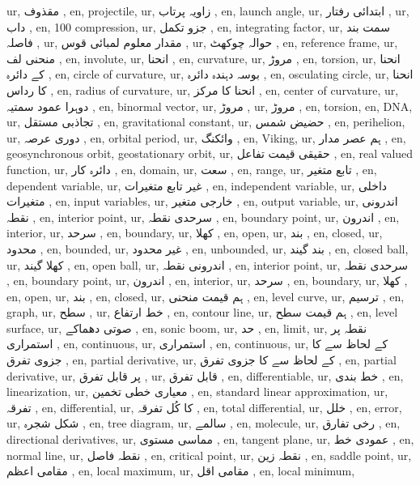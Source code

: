 ur, مقذوف  ,
en, projectile,
ur, زاویہ پرتاب ,
en, launch angle,
ur, ابتدائی رفتار ,
ur,  داب ,
en, 100 compression,
ur, جزو تکمل  ,
en, integrating factor,
ur, سمت بند فاصلہ ,
ur, مقدار معلوم لمبائی قوس ,
ur, حوالہ چوکھٹ ,
en, reference frame,
ur, منحنی لف ,
en, involute,
ur,  انحنا ,
en, curvature,
ur, مروڑ ,
en, torsion,
ur, انحنا کے دائرہ ,
en, circle of curvature,
ur, بوسہ دہندہ دائرہ ,
en, osculating circle,
ur,  انحنا کا رداس ,
en, radius of curvature,
ur,  انحنا کا مرکز ,
en, center of curvature,
ur, دوہرا عمود سمتیہ ,
en, binormal vector,
ur, مروڑ ,
ur, مروڑ ,
en, torsion,
en, DNA,
ur, تجاذبی مستقل ,
en, gravitational constant,
ur, حضیض شمس ,
en, perihelion,
ur, دوری عرصہ  ,
en, orbital period,
ur, وائکنگ  ,
en, Viking,
ur, ہم عصر مدار ,
en, geosynchronous orbit, geostationary orbit,
ur, حقیقی قیمت تفاعل ,
en, real valued function,
ur, دائرہ کار ,
en, domain,
ur, سعت ,
en, range,
ur, تابع متغیر ,
en, dependent variable,
ur, غیر تابع متغیرات ,
en, independent variable,
ur, داخلی متغیرات ,
en, input variables,
ur, خارجی متغیر ,
en, output variable,
ur, اندرونی نقطہ ,
en, interior point,
ur, سرحدی نقطہ ,
en, boundary point,
ur,  اندرون ,
en, interior,
ur, سرحد ,
en, boundary,
ur, کھلا ,
en, open,
ur, بند ,
en, closed,
ur, محدود ,
en, bounded,
ur, غیر محدود ,
en, unbounded,
ur, بند گیند ,
en, closed ball,
ur, کھلا گیند ,
en, open ball,
ur, اندرونی نقطہ ,
en, interior point,
ur, سرحدی نقطہ ,
en, boundary point,
ur, اندرون ,
en, interior,
ur, سرحد ,
en, boundary,
ur, کھلا ,
en, open,
ur,  بند ,
en, closed,
ur, ہم قیمت منحنی ,
en, level curve,
ur, ترسیم ,
en, graph,
ur, سطح ,
ur,  خط ارتفاع ,
en, contour line,
ur,  ہم قیمت سطح ,
en, level surface,
ur, صوتی دھماکے  ,
en, sonic boom,
ur, حد ,
en, limit,
ur, نقطہ  پر استمراری ,
en, continuous,
ur,  استمراری ,
en, continuous,
ur,   کے لحاظ سے  کا جزوی تفرق ,
en, partial derivative,
ur,   کے لحاظ سے  کا جزوی تفرق ,
en, partial derivative,
ur,  پر  قابل تفرق ,
ur,  قابل تفرق ,
en, differentiable,
ur,  خط بندی ,
en, linearization,
ur, معیاری خطی تخمین ,
en, standard linear approximation,
ur, تفرقہ ,
en, differential,
ur,   کا کُل تفرقہ ,
en, total differential,
ur, خلل ,
en, error,
ur, شکل شجرہ ,
en, tree diagram,
ur, سالمے ,
en, molecule,
ur, رخی تفارق ,
en, directional derivatives,
ur, مماسی مستوی  ,
en, tangent plane,
ur, عمودی خط  ,
en, normal line,
ur,  نقطہ فاصل ,
en, critical point,
ur,  نقطہ زین ,
en, saddle point,
ur,  مقامی اعظم  ,
en, local maximum,
ur,  مقامی اقل  ,
en, local minimum,
